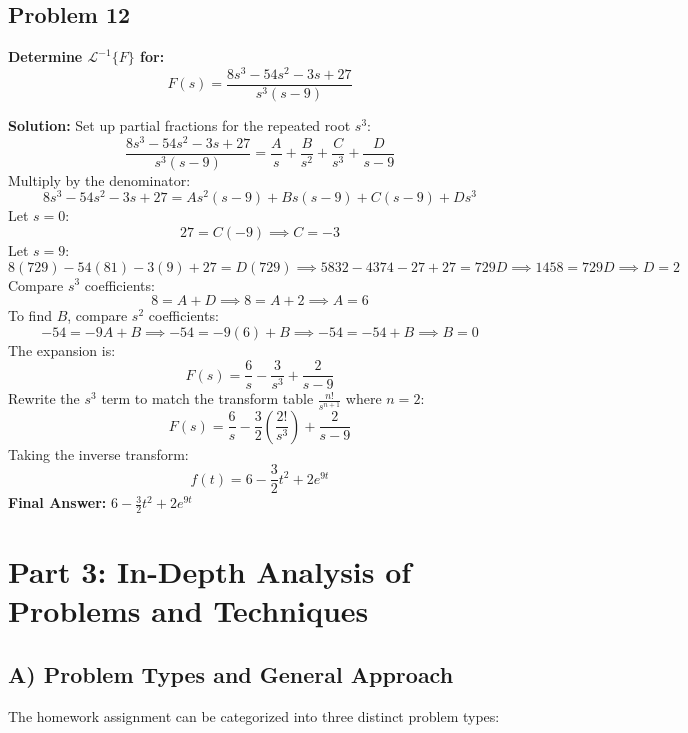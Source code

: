 \documentclass[11pt, a4paper]{article}
\theoremstyle{definition}
\theoremstyle{remark}
\newcommand{\InvLaplace}{\mathcal{L}^{-1}}
\begin{document}
\subsection*{Problem 12}
\textbf{Determine $\InvLaplace\{F\}$ for:}
\[ F(s) = \frac{8s^3 - 54s^2 - 3s + 27}{s^3(s-9)} \]

\textbf{Solution:}
Set up partial fractions for the repeated root $s^3$:
\[ \frac{8s^3 - 54s^2 - 3s + 27}{s^3(s-9)} = \frac{A}{s} + \frac{B}{s^2} + \frac{C}{s^3} + \frac{D}{s-9} \]
Multiply by the denominator:
\[ 8s^3 - 54s^2 - 3s + 27 = As^2(s-9) + Bs(s-9) + C(s-9) + Ds^3 \]
Let $s = 0$:
\[ 27 = C(-9) \implies C = -3 \]
Let $s = 9$:
\[ 8(729) - 54(81) - 3(9) + 27 = D(729) \implies 5832 - 4374 - 27 + 27 = 729D \implies 1458 = 729D \implies D = 2 \]
Compare $s^3$ coefficients:
\[ 8 = A + D \implies 8 = A + 2 \implies A = 6 \]
To find $B$, compare $s^2$ coefficients:
\[ -54 = -9A + B \implies -54 = -9(6) + B \implies -54 = -54 + B \implies B = 0 \]
The expansion is:
\[ F(s) = \frac{6}{s} - \frac{3}{s^3} + \frac{2}{s-9} \]
Rewrite the $s^3$ term to match the transform table $\frac{n!}{s^{n+1}}$ where $n=2$:
\[ F(s) = \frac{6}{s} - \frac{3}{2} \left( \frac{2!}{s^3} \right) + \frac{2}{s-9} \]
Taking the inverse transform:
\[ f(t) = 6 - \frac{3}{2}t^2 + 2e^{9t} \]
\textbf{Final Answer:} $6 - \frac{3}{2}t^2 + 2e^{9t}$

\newpage
\section{Part 3: In-Depth Analysis of Problems and Techniques}

\subsection{A) Problem Types and General Approach}
The homework assignment can be categorized into three distinct problem types:
\end{document}
